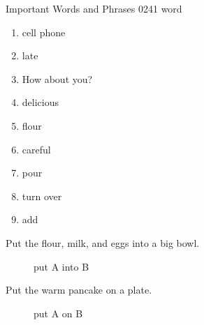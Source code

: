 \documentclass[aspectratio=169,xcolor={dvipsnames,table}]{beamer}
\begin{document}
\begin{frame}[plain]{Important Words and Phrases}
  \hypertarget{WORDS}{}
  \hfill{\tiny 0241}\,{\tiny{}\,word}
  \pause
  \large
  \begin{enumerate}[<+- |alert@+>]
    \item cell phone \hfill{}
    \item late \hfill{}
    \item How about you? \hfill{}
    \item delicious \hfill{}
    \item flour \hfill{}
    \item careful \hfill{}
    \item pour \hfill{}
    \item  turn over\hfill{}
    \item add \hfill{}
  \end{enumerate}

  \hfill\hyperlink{READING}{}
\end{frame}
\begin{frame}[plain]{Put the flour, milk, and eggs into a big bowl.}
  \hypertarget{INTO}{}

  \begin{figure}[htbp]
    \centering
    
    \caption{put A into B}
    \label{fig:bowl-trajectory}
  \end{figure}
  \vspace{-25pt}
  \hfill\hyperlink{READING}{}
\end{frame}
\begin{frame}[plain]{Put the warm pancake on a plate.}
  \hypertarget{ON}{}
  \begin{figure}[htbp]
    \centering
    
    \caption{put A on B}
    \label{fig:plate-trajectory}
  \end{figure}
  \vspace{-25pt}
  \hfill\hyperlink{READING}{}
\end{frame}
\end{document}
